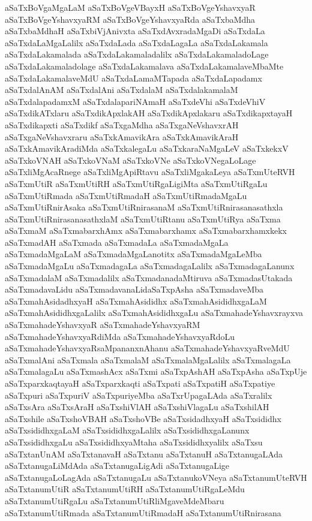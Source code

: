 {aSaTxBoVgaMgaLaM
aSaTxBoVgeVBayxH
aSaTxBoVgeYshavxyaR
aSaTxBoVgeYshavxyaRM
aSaTxBoVgeYshavxyaRda
aSaTxbaMdha
aSaTxbaMdhaH
aSaTxbiVjAnivxta
aSaTxdAvxradaMgaDi
aSaTxdaLa
aSaTxdaLaMgaLalilx
aSaTxdaLada
aSaTxdaLagaLa
aSaTxdaLakamala
aSaTxdaLakamalada
aSaTxdaLakamaladalilx
aSaTxdaLakamaladoLage
aSaTxdaLakamaladolage
aSaTxdaLakamalava
aSaTxdaLakamalaveMbaMte
aSaTxdaLakamalaveMdU
aSaTxdaLamaMTapada
aSaTxdaLapadamx
aSaTxdalAnAM
aSaTxdalAni
aSaTxdalaM
aSaTxdalakamalaM
aSaTxdalapadamxM
aSaTxdalapariNAmaH
aSaTxdeVhi
aSaTxdeVhiV
aSaTxdikATxlaru
aSaTxdikApxlakAH
aSaTxdikApxlakaru
aSaTxdikapxtayaH
aSaTxdikapxti
aSaTxdikf
aSaTxgaMdha
aSaTxgaNeVshavxrAH
aSaTxgaNeVshavxraru
aSaTxkAmavikAra
aSaTxkAmavikAraH
aSaTxkAmavikAradiMda
aSaTxkalegaLu
aSaTxkaraNaMgaLeV
aSaTxkekxV
aSaTxkoVNAH
aSaTxkoVNaM
aSaTxkoVNe
aSaTxkoVNegaLoLage
aSaTxliMgAcaRnege
aSaTxliMgApiRtavu
aSaTxliMgakaLeya
aSaTxmUteRVH
aSaTxmUtiR
aSaTxmUtiRH
aSaTxmUtiRgaLigiMta
aSaTxmUtiRgaLu
aSaTxmUtiRmada
aSaTxmUtiRmadaH
aSaTxmUtiRmadaMgaLu
aSaTxmUtiRnirAsaka
aSaTxmUtiRnirasanaM
aSaTxmUtiRnirasanasathxla
aSaTxmUtiRnirasanasathxlaM
aSaTxmUtiRtanu
aSaTxmUtiRya
aSaTxma
aSaTxmaM
aSaTxmabarxhAmx
aSaTxmabarxhamx
aSaTxmabarxhamxkekx
aSaTxmadAH
aSaTxmada
aSaTxmadaLa
aSaTxmadaMgaLa
aSaTxmadaMgaLaM
aSaTxmadaMgaLanotitx
aSaTxmadaMgaLeMba
aSaTxmadaMgaLu
aSaTxmadagaLa
aSaTxmadagaLalilx
aSaTxmadagaLanunx
aSaTxmadalaM
aSaTxmadalilx
aSaTxmadanadaMtiruva
aSaTxmadasUtakada
aSaTxmadavaLidu
aSaTxmadavanaLidaSaTxpAsha
aSaTxmadaveMba
aSaTxmahAsidadhxyaH
aSaTxmahAsididhx
aSaTxmahAsididhxgaLaM
aSaTxmahAsididhxgaLalilx
aSaTxmahAsididhxgaLu
aSaTxmahadeYshavxrayxva
aSaTxmahadeYshavxyaR
aSaTxmahadeYshavxyaRM
aSaTxmahadeYshavxyaRdiMda
aSaTxmahadeYshavxyaRdoLu
aSaTxmahadeYshavxyaRsaMpananxnAhanu
aSaTxmahadeYshavxyaRveMdU
aSaTxmalAni
aSaTxmala
aSaTxmalaM
aSaTxmalaMgaLalilx
aSaTxmalagaLa
aSaTxmalagaLu
aSaTxmashAcx
aSaTxmi
aSaTxpAshAH
aSaTxpAsha
aSaTxpUje
aSaTxparxkaqtayaH
aSaTxparxkaqti
aSaTxpati
aSaTxpatiH
aSaTxpatiye
aSaTxpuri
aSaTxpuriV
aSaTxpuriyeMba
aSaTxrUpagaLAda
aSaTxralilx
aSaTxsAra
aSaTxsAraH
aSaTxshiVlAH
aSaTxshiVlagaLu
aSaTxshilAH
aSaTxshile
aSaTxshoVBAH
aSaTxshoVBe
aSaTxsidadhxyaH
aSaTxsididhx
aSaTxsididhxgaLaM
aSaTxsididhxgaLalilx
aSaTxsididhxgaLanunx
aSaTxsididhxgaLu
aSaTxsididhxyaMtaha
aSaTxsididhxyalilx
aSaTxsu
aSaTxtanUnAM
aSaTxtanavaH
aSaTxtanu
aSaTxtanuH
aSaTxtanugaLAda
aSaTxtanugaLiMdAda
aSaTxtanugaLigAdi
aSaTxtanugaLige
aSaTxtanugaLoLagAda
aSaTxtanugaLu
aSaTxtanukoVNeya
aSaTxtanumUteRVH
aSaTxtanumUtiR
aSaTxtanumUtiRH
aSaTxtanumUtiRgaLeMdu
aSaTxtanumUtiRgaLu
aSaTxtanumUtiRliMgaveMdeMbaru
aSaTxtanumUtiRmada
aSaTxtanumUtiRmadaH
aSaTxtanumUtiRnirasana
}

